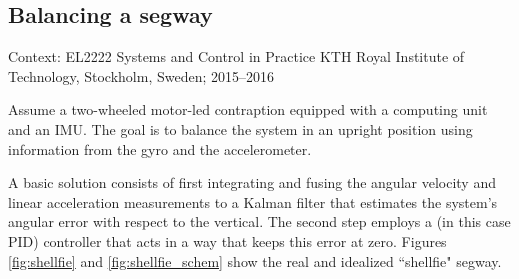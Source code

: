 \subsection{Balancing a segway}

\noindent Context: EL2222 Systems and Control in Practice
\noindent KTH Royal Institute of Technology, Stockholm, Sweden; 2015--2016 \\

\begin{problem}
Assume a two-wheeled motor-led contraption equipped with a
computing unit and an IMU. The goal is to balance the system in an upright
position using information from the gyro and the accelerometer.
\end{problem}


A basic solution consists of first integrating and fusing the angular velocity
and linear acceleration measurements to a Kalman filter that estimates the
system's angular error with respect to the vertical. The second step employs a
(in this case PID) controller that acts in a way that keeps this error at zero.
Figures \ref{fig:shellfie} and \ref{fig:shellfie_schem} show the real and
idealized ``shellfie" segway.

